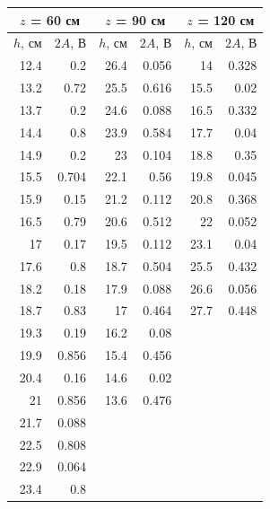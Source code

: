\begin{table}[htbp]
	\centering
	\begin{tabular}{|r|r|r|r|r|r|}
		\toprule
		\multicolumn{2}{|c|}{$z$ = 60 см} & \multicolumn{2}{c|}{$z$ = 90 см} & \multicolumn{2}{c|}{$z$ = 120 см} \\
		\midrule
		\multicolumn{1}{|l|}{$h$, см} & \multicolumn{1}{l|}{$2A$, В} & \multicolumn{1}{l|}{$h$, см} & \multicolumn{1}{l|}{$2A$, В} & \multicolumn{1}{l|}{$h$, см} & \multicolumn{1}{l|}{$2A$, В} \\
		\midrule
		12.4  & 0.2   & 26.4  & 0.056 & 14    & 0.328 \\
		\midrule
		13.2  & 0.72  & 25.5  & 0.616 & 15.5  & 0.02 \\
		\midrule
		13.7  & 0.2   & 24.6  & 0.088 & 16.5  & 0.332 \\
		\midrule
		14.4  & 0.8   & 23.9  & 0.584 & 17.7  & 0.04 \\
		\midrule
		14.9  & 0.2   & 23    & 0.104 & 18.8  & 0.35 \\
		\midrule
		15.5  & 0.704 & 22.1  & 0.56  & 19.8  & 0.045 \\
		\midrule
		15.9  & 0.15  & 21.2  & 0.112 & 20.8  & 0.368 \\
		\midrule
		16.5  & 0.79  & 20.6  & 0.512 & 22    & 0.052 \\
		\midrule
		17    & 0.17  & 19.5  & 0.112 & 23.1  & 0.04 \\
		\midrule
		17.6  & 0.8   & 18.7  & 0.504 & 25.5  & 0.432 \\
		\midrule
		18.2  & 0.18  & 17.9  & 0.088 & 26.6  & 0.056 \\
		\midrule
		18.7  & 0.83  & 17    & 0.464 & 27.7  & 0.448 \\
		\midrule
		19.3  & 0.19  & 16.2  & 0.08  &       &  \\
		\midrule
		19.9  & 0.856 & 15.4  & 0.456 &       &  \\
		\midrule
		20.4  & 0.16  & 14.6  & 0.02  &       &  \\
		\midrule
		21    & 0.856 & 13.6  & 0.476 &       &  \\
		\midrule
		21.7  & 0.088 &       &       &       &  \\
		\midrule
		22.5  & 0.808 &       &       &       &  \\
		\midrule
		22.9  & 0.064 &       &       &       &  \\
		\midrule
		23.4  & 0.8   &       &       &       &  \\

\end{tabular}
\end{table}

